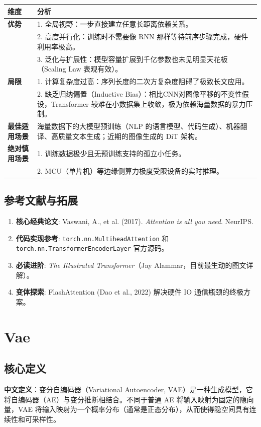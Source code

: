 \documentclass[12pt, a4paper]{book}
\begin{document}
\begin{table}[h]
\centering
\begin{tabular}{|p{}|p{}|}
\hline
\textbf{维度} & \textbf{分析} \\
\hline
\textbf{优势} & 1. 全局视野：一步直接建立任意长距离依赖关系。\\
& 2. 高度并行化：训练时不需要像 RNN 那样等待前序步骤完成，硬件利用率极高。\\
& 3. 泛化与扩展性：模型容量扩展到千亿参数也未见明显天花板（Scaling Law 表观有效）。\\
\hline
\textbf{局限} & 1. 计算复杂度过高：序列长度的二次方复杂度阻碍了极致长文应用。\\
& 2. 缺乏归纳偏置（Inductive Bias）：相比CNN对图像平移的不变性假设，Transformer 较难在小数据集上收敛，极为依赖海量数据的暴力压制。\\
\hline
\textbf{最佳适用场景} & 海量数据下的大模型预训练（NLP 的语言模型、代码生成）、机器翻译、高质量文本生成；近期的图像生成的 DiT 架构。\\
\hline
\textbf{绝对慎用场景} & 1. 训练数据极少且无预训练支持的孤立小任务。\\
& 2. MCU（单片机）等边缘侧算力极度受限设备的实时推理。\\
\hline
\end{tabular}
\end{table}

\section{参考文献与拓展}
\begin{enumerate}
    \item \textbf{核心经典论文}: Vaswani, A., et al. (2017). \textit{Attention is all you need}. NeurIPS. 
    \item \textbf{代码实现参考}: \texttt{torch.nn.MultiheadAttention} 和 \texttt{torch.nn.TransformerEncoderLayer} 官方源码。
    \item \textbf{必读进阶}: \textit{The Illustrated Transformer}（Jay Alammar，目前最生动的图文详解）。
    \item \textbf{变体探索}: FlashAttention (Dao et al., 2022) 解决硬件 IO 通信瓶颈的终极方案。
\end{enumerate}

\chapter{Vae}


\section{核心定义}
\textbf{中文定义}：变分自编码器（Variational Autoencoder, VAE）是一种生成模型，它将自编码器（AE）与变分推断相结合。不同于普通 AE 将输入映射为固定的隐向量，VAE 将输入映射为一个概率分布（通常是正态分布），从而使得隐空间具有连续性和可采样性。
\end{document}
